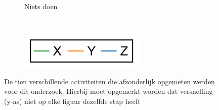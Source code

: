 \documentclass{article}
\begin{document}
\begin{figure}
\begin{subfigure}[b]{.49\linewidth}
    \caption{Niets doen}\label{fig:1j}
  \end{subfigure} \\
  \begin{subfigure}[b]{.49\linewidth}
    \centering
    \includegraphics[width=.25\textwidth]{figures/legend}
  \end{subfigure}
  

  \caption{De tien verschillende activiteiten die afzonderlijk opgemeten werden voor dit onderzoek. Hierbij moet opgemerkt worden dat versnelling (y-as) niet op elke figuur dezelfde stap heeft}
  \label{fig:8}
\end{figure}
\end{document}
